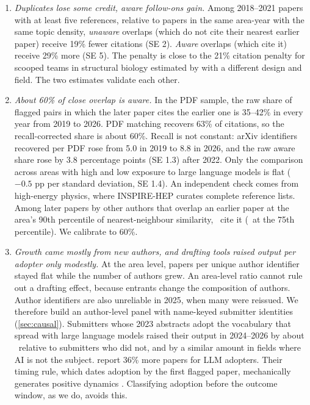 \begin{enumerate}[label=\textbf{Fact \arabic*.},ref=\arabic*,leftmargin=*]
\item\label{fact:credit} \emph{Duplicates lose some credit, aware follow-ons gain.}
Among 2018--2021 papers with at least five references, relative to papers in the
same area-year with the same topic density, \emph{unaware} overlaps (which do not
cite their nearest earlier paper) receive 19\% fewer citations (SE 2). \emph{Aware}
overlaps (which cite it) receive 29\% more (SE 5). The penalty is close to the
21\% citation penalty for scooped teams in structural biology estimated by
\citet{hillstein2025} with a different design and field. The two estimates
validate each other.

\item\label{fact:aware} \emph{About 60\% of close overlap is aware.} In the PDF
sample, the raw share of flagged pairs in which the later paper cites the earlier
one is 35--42\% in every year from 2019 to 2026. PDF matching recovers 63\% of
citations, so the recall-corrected share is about 60\%. Recall is not constant:
arXiv identifiers recovered per PDF rose from 5.0 in 2019 to 8.8 in 2026, and the
raw aware share rose by 3.8 percentage points (SE 1.3) after 2022. Only the
comparison across areas with high and low exposure to large language models is
flat ($-0.5$ pp per standard deviation, SE 1.4). An independent check comes from
high-energy physics, where INSPIRE-HEP curates complete reference lists. Among later
papers by other authors that overlap an earlier paper at the area's 90th
percentile of nearest-neighbour similarity, \empAwareInsNinety\ cite it
(\empAwareInsSevfive\ at the 75th percentile). We calibrate to 60\%.

\item\label{fact:authors} \emph{Growth came mostly from new authors, and drafting
tools raised output per adopter only modestly.} At the area level, papers per
unique author identifier stayed flat while the number of authors grew. An
area-level ratio cannot rule out a drafting effect, because entrants change the
composition of authors. Author identifiers are also unreliable in 2025, when many
were reissued. We therefore build an author-level panel with name-keyed
submitter identities (\cref{sec:causal}). Submitters whose 2023 abstracts adopt
the vocabulary that spread with large language models
\citep{liangetal2024,kobaketal2025} raised their output in 2024--2026 by about
\empLLMallPct\ relative to submitters who did not, and by a similar amount in
fields where AI is not the subject. \citet{kusumegietal2025} report 36\% more
papers for LLM adopters. Their timing rule, which dates adoption by the first
flagged paper, mechanically generates positive dynamics \citep{renaultetal2026}.
Classifying adoption before the outcome window, as we do, avoids this.
\end{enumerate}

